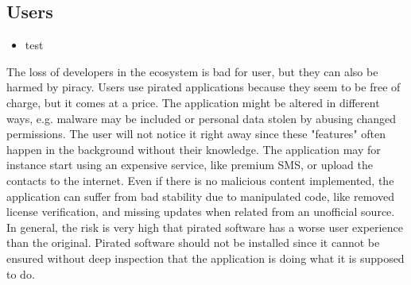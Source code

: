 \subsection{Users} \label{subsection:foundation-piracy-users}
\begin{itemize}
    \item test
\end{itemize}
The loss of developers in the ecosystem is bad for user, but they can also be harmed by piracy.
Users use pirated applications because they seem to be free of charge, but it comes at a price.
The application might be altered in different ways, e.g. malware may be included or personal data stolen by abusing changed permissions.
The user will not notice it right away since these "features" often happen in the background without their knowledge.
The application may for instance start using an expensive service, like premium SMS, or upload the contacts to the internet.
Even if there is no malicious content implemented, the application can suffer from bad stability due to manipulated code, like removed license verification, and missing updates when related from an unofficial source.
In general, the risk is very high that pirated software has a worse user experience than the original.
Pirated software should not be installed since it cannot be ensured without deep inspection that the application is doing what it is supposed to do. \cite{bitdefenderPlagiarism}\cite{lierschDeveloperThreats}

